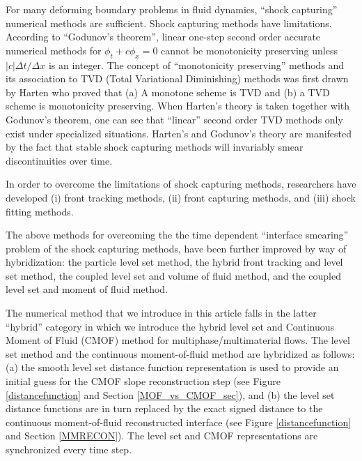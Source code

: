 \documentclass[]{article}
\begin{document}
For many deforming boundary problems in fluid dynamics, ``shock capturing''
numerical methods are 
sufficient\cite{godunov1959finite,colella1984piecewise,van1979towards,harten1997high,shu1988efficient,saurel1999multiphase}. Shock capturing methods
have limitations.  According to 
``Godunov's theorem''\cite{godunov1954different}, linear one-step second
order accurate numerical methods for $\phi_{t}+c\phi_{x}=0$ cannot be
monotonicity preserving unless $|c|\Delta t/\Delta x$ is an 
integer.  The concept of ``monotonicity preserving'' methods and its
association to TVD (Total Variational Diminishing) methods was first 
drawn by Harten\cite{harten1997high} who proved that (a) A monotone
scheme is TVD and (b) a TVD scheme is monotonicity preserving.  
When Harten's theory is taken together with Godunov's theorem, one can
see that ``linear'' second order TVD methods only exist under
specialized situations.  Harten's and Godunov's theory are manifested by the
fact that stable shock capturing methods will invariably smear 
discontinuities over time.  

In order to overcome the limitations of shock capturing methods, researchers
have developed (i) front tracking 
methods\cite{glimm1981front,unverdi1992front},
(ii) front capturing 
methods\cite{markstein1951interaction,osher1988fronts,sussman1994level,hirt1981volume,brackbill1992continuum,ahn2007multi,ahn2009adaptive,olsson2005conservative,QiuETALPINNPHASEFIELD2022,
huang2020consistent}, and
(iii) shock fitting methods\cite{SalasShockfitting1976}.

The above methods for overcoming the
the time dependent 
``interface smearing'' problem of the shock capturing methods, have been
further improved by way of hybridization:
the particle level set method\cite{enright2002hybrid},
the hybrid front tracking and level set method\cite{shin2009hybrid},
the coupled level set and volume of fluid method\cite{sussman2000coupled},
and the coupled level set and moment of fluid 
method\cite{ASURIMUKUNDAN2022110864,jemison2013coupled}.

The numerical method that we introduce in this article falls in the latter
``hybrid'' category in which we introduce the hybrid level set and 
Continuous Moment of Fluid (CMOF) method for multiphase/multimaterial
flows.  The level set method and the continuous moment-of-fluid method
are hybridized as follows:
(a) the smooth level set distance function representation is used
to provide an initial guess for the CMOF slope reconstruction
step (see Figure \ref{distancefunction} and Section \ref{MOF_vs_CMOF_sec}),
and (b) the level set distance functions are in turn replaced by the
exact signed distance to the continuous moment-of-fluid reconstructed
interface (see Figure \ref{distancefunction} and 
Section \ref{MMRECON}).  The level set and CMOF representations are 
synchronized every time step.
\end{document}
